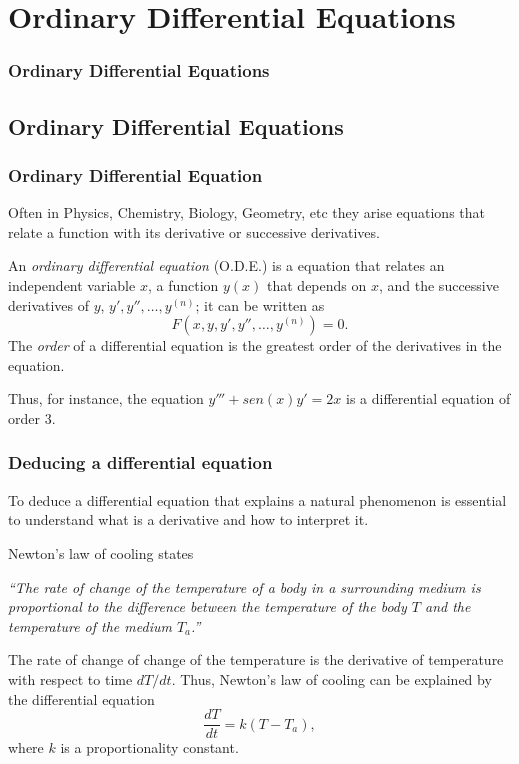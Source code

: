 
\section{Ordinary Differential Equations}
\begin{frame}
\frametitle{Ordinary Differential Equations}
\tableofcontents[sectionstyle=show/hide,hideothersubsections]
\end{frame}



\subsection{Ordinary Differential Equations}
\begin{frame}
\frametitle{Ordinary Differential Equation}
Often in Physics, Chemistry, Biology, Geometry, etc they arise equations that relate a function with its derivative or successive derivatives.

\begin{definition}
An \emph{ordinary differential equation} (O.D.E.) is a equation that relates an independent variable $x$, a function $y(x)$ that depends on $x$, and the successive derivatives of $y$, $y',y'',\ldots,y^{(n)}$; it can be written as
\[
F(x, y, y', y'',\ldots, y^{(n)})=0.
\] 
The \emph{order} of a differential equation is the greatest order of the derivatives in the equation. 
\end{definition}
Thus, for instance, the equation $y'''+sen(x)y'=2x$ is a differential equation of order 3.
\end{frame}


\begin{frame}
\frametitle{Deducing a differential equation}
To deduce a differential equation that explains a natural phenomenon is essential to understand what is a derivative and how to interpret it. 

 Newton's law of cooling states
\begin{center}
\begin{minipage}{0.8\textwidth}
\textit{``The rate of change of the temperature of a body in a surrounding medium is proportional to the difference between the temperature of the body $T$ and the temperature of the medium $T_a$.''}
\end{minipage}
\end{center}
The rate of change of change of the temperature is the derivative of temperature with respect to time $dT/dt$.
Thus, Newton's law of cooling can be explained by the differential equation
\[
\frac{dT}{dt}=k(T-T_a),
\]
where $k$ is a proportionality constant.
\end{frame}


